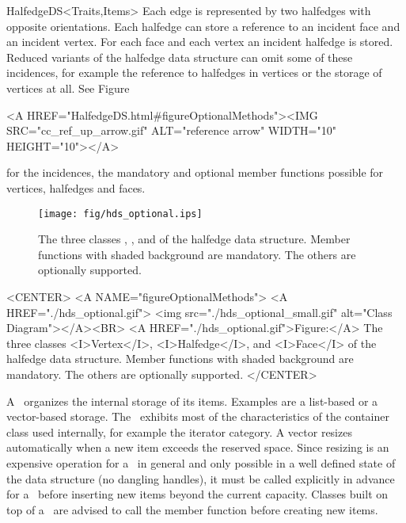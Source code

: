 \begin{ccRefConcept}{HalfedgeDS<Traits,Items>}
Each edge is represented by two halfedges with opposite orientations.
Each halfedge can store a reference to an incident face and an
incident vertex.  For each face and each vertex an incident halfedge
is stored.  Reduced variants of the halfedge data structure can omit
some of these incidences, for example the reference to halfedges in
vertices or the storage of vertices at all. See 
Figure~\ccTexHtml{\ref{figureOptionalMethods}}{}\begin{ccHtmlOnly}
  <A HREF="HalfedgeDS.html#figureOptionalMethods"><IMG 
  SRC="cc_ref_up_arrow.gif" ALT="reference arrow" WIDTH="10" HEIGHT="10"></A>
\end{ccHtmlOnly}
for the incidences, the mandatory and optional member functions
possible for vertices, halfedges and faces.

\begin{ccTexOnly}
    \begin{figure}[bht]
        \begin{center}
          \parbox{\textwidth}{%
              \texttt{[image: fig/hds\_optional.ips]}%
          }
        \end{center}
        \caption{The three classes \protect{}, 
          \protect{}, and 
          \protect{} of the halfedge data structure. Member
          functions with shaded background are mandatory. The others
          are optionally supported.}
        \label{figureOptionalMethods}
    \end{figure}
\end{ccTexOnly}

\begin{ccHtmlOnly}
    <CENTER>
    <A NAME="figureOptionalMethods">
    <A HREF="./hds_optional.gif">
        <img src="./hds_optional_small.gif" 
             alt="Class Diagram"></A><BR>
    <A HREF="./hds_optional.gif">Figure:</A>
    The three classes <I>Vertex</I>, <I>Halfedge</I>, and 
          <I>Face</I> of the halfedge data structure. Member
          functions with shaded background are mandatory. The others
          are optionally supported.
    </CENTER>
\end{ccHtmlOnly}

A \ccRefName\ organizes the internal storage of its items.  Examples
are a list-based or a vector-based storage. The \ccRefName\ exhibits
most of the characteristics of the container class used internally,
for example the iterator category. A vector resizes
automatically when a new item exceeds the reserved space. Since
resizing is an expensive operation for a \ccRefName\ in general and
only possible in a well defined state of the data structure (no
dangling handles), it must be called explicitly in advance for a
\ccRefName\ before inserting new items beyond the current capacity.
Classes built on top of a \ccRefName\ are advised to call the
 member function before creating new items.


\end{ccRefConcept}
